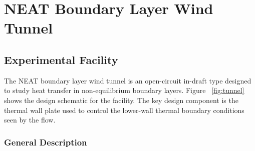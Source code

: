 \chapter{NEAT Boundary Layer Wind Tunnel}

\section{Experimental Facility}

The NEAT boundary layer wind tunnel is an open-circuit in-draft type designed to study heat transfer in non-equilibrium boundary layers. Figure ~\ref{fig:tunnel} shows the design schematic for the facility. The key design component is the thermal wall plate used to control the lower-wall thermal boundary conditions seen by the flow. 


\subsection{General Description}

